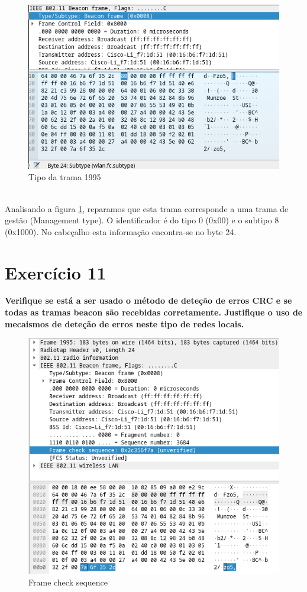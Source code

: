 \documentclass[a4paper]{report}
\begin{document}
\begin{figure}[H]
    \centering 
    \includegraphics[width=\textwidth]{images/tipoEx10.png}  
    \caption{Tipo da trama 1995}
    \label{fig:tipoEx10}
\end{figure}\\

Analisando a figura \ref{fig:tipoEx10}, reparamos que esta trama corresponde a
uma trama de gestão (Management type). O identificador é do tipo 0 (0x00) e o
subtipo 8 (0x1000). No cabeçalho esta informação encontra-se no byte 24.

\section{Exercício 11}
\textbf{Verifique se está a ser usado o método de deteção de erros CRC e se
    todas as tramas beacon são recebidas corretamente. Justifique o uso de
    mecaismos de deteção de erros neste tipo de redes locais.}\\

\begin{figure}[H]
    \centering 
    \includegraphics[width=\textwidth]{images/erroEx11.png}  
    \caption{Frame check sequence}
    \label{fig:erroEx11}
\end{figure}\\
\end{document}
